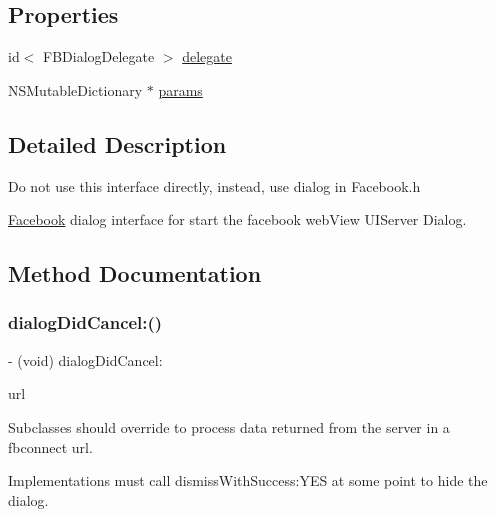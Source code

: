 \subsection*{Properties}
\begin{DoxyCompactItemize}
\item 
id$<$ F\+B\+Dialog\+Delegate $>$ \hyperlink{interfaceFBDialog_a158079f95fccddae603fd2c01a230e38}{delegate}
\item 
N\+S\+Mutable\+Dictionary $\ast$ \hyperlink{interfaceFBDialog_a19b9b51024f653d44d8ac39b0f343046}{params}
\end{DoxyCompactItemize}


\subsection{Detailed Description}
Do not use this interface directly, instead, use dialog in Facebook.\+h

\hyperlink{interfaceFacebook}{Facebook} dialog interface for start the facebook web\+View U\+I\+Server Dialog. 

\subsection{Method Documentation}
\mbox{\label{interfaceFBDialog_a91e729bd79578cb130cf5256e1fb2b8e}} 
\subsubsection{\texorpdfstring{dialog\+Did\+Cancel\+:()}{dialogDidCancel:()}\hspace{0.1cm}{\footnotesize\ttfamily [1/2]}}
{\footnotesize\ttfamily -\/ (void) dialog\+Did\+Cancel\+: \begin{DoxyParamCaption}\item[{(N\+S\+U\+RL $\ast$)}]{url }\end{DoxyParamCaption}}

Subclasses should override to process data returned from the server in a \textquotesingle{}fbconnect\textquotesingle{} url.

Implementations must call dismiss\+With\+Success\+:Y\+ES at some point to hide the dialog. \mbox{\label{interfaceFBDialog_a91e729bd79578cb130cf5256e1fb2b8e}} 
